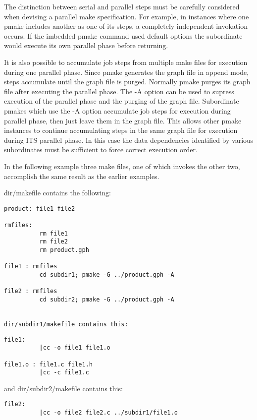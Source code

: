 The distinction between serial and parallel steps must be carefully considered
when devising a parallel make specification.  For example, in instances where
one pmake includes another as one of its steps, a completely independent 
invokation occurs.  If the imbedded pmake command used default options the
subordinate would execute its own parallel phase before returning.  

It is also possible to accumulate job steps from multiple make files for
execution during one parallel phase.  Since pmake generates the graph file in
append mode, steps accumulate until the graph file is purged.  Normally pmake
purges its graph file after executing the parallel phase.  The -A option can
be used to supress execution of the parallel phase and the purging of the
graph file.  Subordinate pmakes which use the -A option accumulate job steps
for execution during parallel phase, then just leave them in the graph file.
This allows other pmake instances to continue accumulating steps in the same
graph file for execution during ITS parallel phase. In this case the data
dependencies identified by various subordinates must be sufficient to force
correct execution order.
 
In the following example three make files, one of which invokes the other two,
accomplish the same result as the earlier examples.
 
dir/makefile contains the following:

\begin{verbatim}
product: file1 file2
 
rmfiles:
          rm file1
          rm file2
          rm product.gph
 
file1 : rmfiles
          cd subdir1; pmake -G ../product.gph -A
 
file2 : rmfiles
          cd subdir2; pmake -G ../product.gph -A
 
 
dir/subdir1/makefile contains this:
\end{verbatim}
 
\begin{verbatim}
file1:
          |cc -o file1 file1.o
 
file1.o : file1.c file1.h
          |cc -c file1.c
\end{verbatim}
 
and dir/subdir2/makefile contains this:
 
\begin{verbatim}
file2:
          |cc -o file2 file2.c ../subdir1/file1.o
\end{verbatim}


